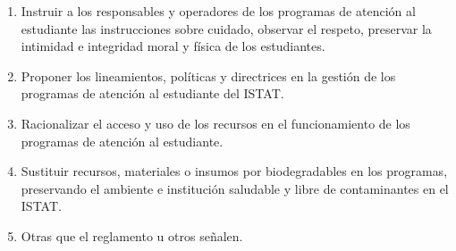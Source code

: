 \begin{enumerate}
\item Instruir a los responsables y operadores de los programas de atención al estudiante las instrucciones sobre cuidado, observar el respeto, preservar la intimidad e integridad moral y física de los estudiantes. 
\item Proponer los lineamientos, políticas y directrices en la gestión de los programas de atención al estudiante del ISTAT. 
\item Racionalizar el acceso y uso de los recursos en el funcionamiento de los programas de atención al estudiante. 
\item Sustituir recursos, materiales o insumos por biodegradables en los programas, preservando el ambiente e institución saludable y libre de contaminantes en el ISTAT. 
\item Otras que el reglamento u otros señalen. 
\end{enumerate}
